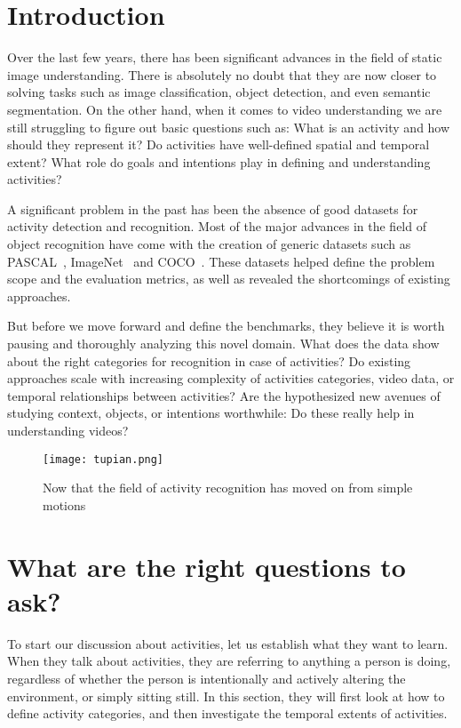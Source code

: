 \documentclass[10pt,twocolumn,letterpaper]{article}
\begin{document}
\section{Introduction}
Over the last few years, there has been significant advances in the field of static image understanding. There is absolutely no doubt that they are now closer to solving tasks such as image classification, object detection, and even semantic segmentation. On the other hand, when it comes to video understanding we are still struggling to figure out basic questions such as: What is an activity and how should they represent it? Do activities have well-defined spatial and temporal extent? What role do goals and intentions play in defining and understanding activities?
\par A significant problem in the past has been the absence of good datasets for activity detection and recognition. Most of the major advances in the field of object recognition have come with the creation of generic datasets such as PASCAL~\cite{name6}, ImageNet~\cite{name3} and COCO~\cite{name21}. These datasets helped define the problem scope and the evaluation metrics, as well as revealed the shortcomings of existing approaches. 
\par But before we move forward and define the benchmarks, they believe it is worth pausing and thoroughly analyzing this novel domain. What does the data show about the right categories for recognition in case of activities? Do existing approaches scale with increasing complexity of activities
categories, video data, or temporal relationships between activities? Are the hypothesized new avenues of studying context, objects, or intentions worthwhile: Do these really help in understanding videos?
  \begin{figure}[!htb]
  	\centering
  	\texttt{[image: tupian.png]}\\
  	\caption{Now that the field of activity recognition has moved on from simple motions}\label{Figure1} 
  \end{figure}
\section{What are the right questions to ask?}
To start our discussion about activities, let us establish what they want to learn. When they talk about activities, they are referring to anything a person is doing, regardless of whether the person is intentionally and actively altering the environment, or simply sitting still. In this section, they will first look at how to define activity categories, and then investigate the temporal extents of activities.
\end{document}
